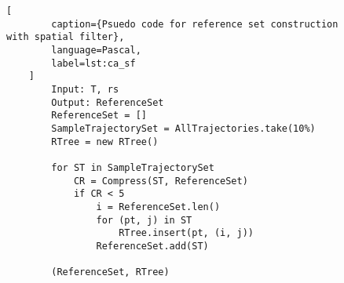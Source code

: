 \begin{figure}[b]
    \begin{lstlisting}[
        caption={Psuedo code for reference set construction with spatial filter},
        language=Pascal,
        label=lst:ca_sf
    ]
        Input: T, rs
        Output: ReferenceSet
        ReferenceSet = []
        SampleTrajectorySet = AllTrajectories.take(10%)
        RTree = new RTree()

        for ST in SampleTrajectorySet
            CR = Compress(ST, ReferenceSet)
            if CR < 5 
                i = ReferenceSet.len()
                for (pt, j) in ST
                    RTree.insert(pt, (i, j))
                ReferenceSet.add(ST)

        (ReferenceSet, RTree)
    \end{lstlisting}
\end{figure}